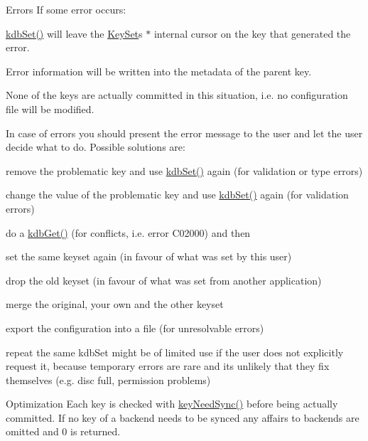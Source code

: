 \begin{DoxyParagraph}{Errors}
If some error occurs\+:
\begin{DoxyItemize}
\item \mbox{\hyperlink{group__kdb_ga11436b058408f83d303ca5e996832bcf}{kdb\+Set()}} will leave the \mbox{\hyperlink{classkdb_1_1KeySet}{Key\+Set}}\textquotesingle{}s $\ast$ internal cursor on the key that generated the error.
\item Error information will be written into the metadata of the parent key.
\item None of the keys are actually committed in this situation, i.\+e. no configuration file will be modified.
\end{DoxyItemize}
\end{DoxyParagraph}
In case of errors you should present the error message to the user and let the user decide what to do. Possible solutions are\+:
\begin{DoxyItemize}
\item remove the problematic key and use \mbox{\hyperlink{group__kdb_ga11436b058408f83d303ca5e996832bcf}{kdb\+Set()}} again (for validation or type errors)
\item change the value of the problematic key and use \mbox{\hyperlink{group__kdb_ga11436b058408f83d303ca5e996832bcf}{kdb\+Set()}} again (for validation errors)
\item do a \mbox{\hyperlink{group__kdb_ga28e385fd9cb7ccfe0b2f1ed2f62453a1}{kdb\+Get()}} (for conflicts, i.\+e. error C02000) and then
\begin{DoxyItemize}
\item set the same keyset again (in favour of what was set by this user)
\item drop the old keyset (in favour of what was set from another application)
\item merge the original, your own and the other keyset
\end{DoxyItemize}
\item export the configuration into a file (for unresolvable errors)
\item repeat the same kdb\+Set might be of limited use if the user does not explicitly request it, because temporary errors are rare and its unlikely that they fix themselves (e.\+g. disc full, permission problems)
\end{DoxyItemize}

\begin{DoxyParagraph}{Optimization}
Each key is checked with \mbox{\hyperlink{group__keytest_gaf247df0de7aca04b32ef80e39ef12950}{key\+Need\+Sync()}} before being actually committed. If no key of a backend needs to be synced any affairs to backends are omitted and 0 is returned.
\end{DoxyParagraph}

